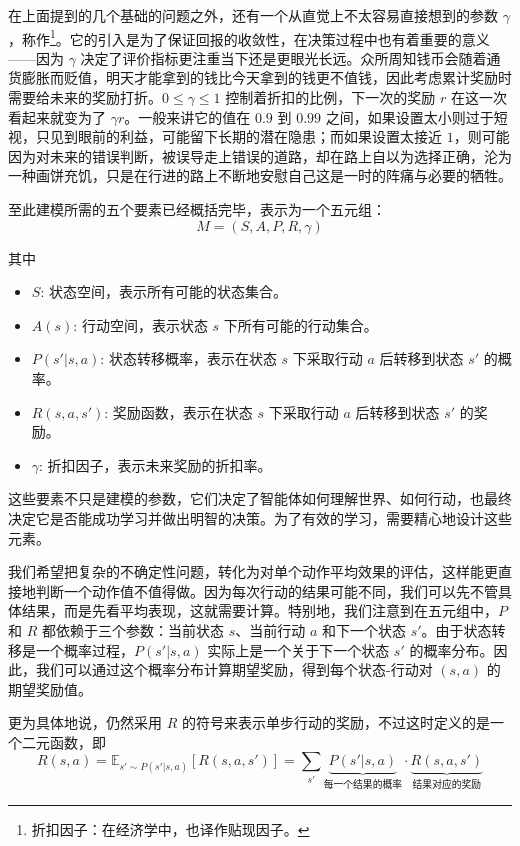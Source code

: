 在上面提到的几个基础的问题之外，还有一个从直觉上不太容易直接想到的参数 $\gamma$，称作\footnote{折扣因子：在经济学中，也译作贴现因子。}。它的引入是为了保证回报的收敛性，在决策过程中也有着重要的意义——因为 $\gamma$ 决定了评价指标更注重当下还是更眼光长远。众所周知钱币会随着通货膨胀而贬值，明天才能拿到的钱比今天拿到的钱更不值钱，因此考虑累计奖励时需要给未来的奖励打折。$0 \le \gamma \le 1$ 控制着折扣的比例，下一次的奖励 $r$ 在这一次看起来就变为了 $\gamma r$。一般来讲它的值在 $0.9$ 到 $0.99$ 之间，如果设置太小则过于短视，只见到眼前的利益，可能留下长期的潜在隐患；而如果设置太接近 $1$，则可能因为对未来的错误判断，被误导走上错误的道路，却在路上自以为选择正确，沦为一种画饼充饥，只是在行进的路上不断地安慰自己这是一时的阵痛与必要的牺牲。

至此建模所需的五个要素已经概括完毕，表示为一个五元组：
\[
    M = (S, A, P, R, \gamma)
\]

其中
\begin{itemize}
    \item $S$: 状态空间，表示所有可能的状态集合。
    \item $A(s)$: 行动空间，表示状态 $s$ 下所有可能的行动集合。
    \item $P(s' | s, a)$: 状态转移概率，表示在状态 $s$ 下采取行动 $a$ 后转移到状态 $s'$ 的概率。
    \item $R(s, a, s')$: 奖励函数，表示在状态 $s$ 下采取行动 $a$ 后转移到状态 $s'$ 的奖励。
    \item $\gamma$: 折扣因子，表示未来奖励的折扣率。
\end{itemize}

这些要素不只是建模的参数，它们决定了智能体如何理解世界、如何行动，也最终决定它是否能成功学习并做出明智的决策。为了有效的学习，需要精心地设计这些元素。

我们希望把复杂的不确定性问题，转化为对单个动作平均效果的评估，这样能更直接地判断一个动作值不值得做。因为每次行动的结果可能不同，我们可以先不管具体结果，而是先看平均表现，这就需要计算。特别地，我们注意到在五元组中，$P$ 和 $R$ 都依赖于三个参数：当前状态 $s$、当前行动 $a$ 和下一个状态 $s'$。由于状态转移是一个概率过程，$P(s' | s, a)$ 实际上是一个关于下一个状态 $s'$ 的概率分布。因此，我们可以通过这个概率分布计算期望奖励，得到每个状态-行动对 $(s, a)$ 的期望奖励值。

更为具体地说，仍然采用 $R$ 的符号来表示单步行动的奖励，不过这时定义的是一个二元函数，即
\[
    R(s, a) = \mathbb{E}_{s' \sim P(s' | s, a)}[R(s, a, s')] = \sum_{s'} \underset{\text{每一个结果的概率}}{\underbrace{P(s' | s, a)}} \cdot \underset{\text{结果对应的奖励}}{\underbrace{R(s, a, s')}}
\]

